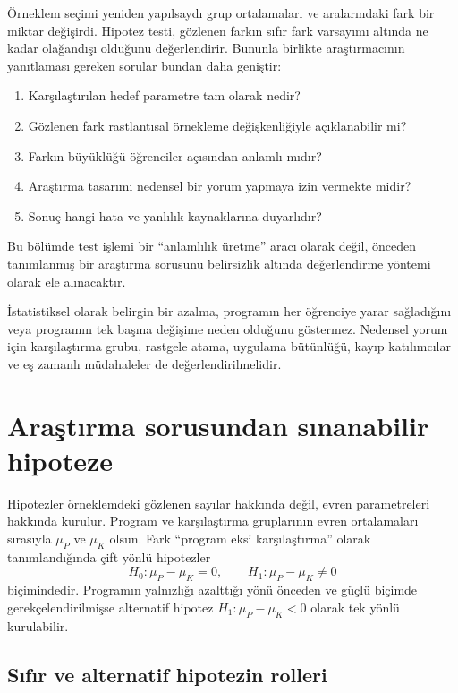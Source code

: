 Örneklem seçimi yeniden yapılsaydı grup ortalamaları ve aralarındaki fark bir
miktar değişirdi. Hipotez testi, gözlenen farkın sıfır fark varsayımı altında
ne kadar olağandışı olduğunu değerlendirir. Bununla birlikte araştırmacının
yanıtlaması gereken sorular bundan daha geniştir:

\begin{enumerate}
  \item Karşılaştırılan hedef parametre tam olarak nedir?
  \item Gözlenen fark rastlantısal örnekleme değişkenliğiyle açıklanabilir mi?
  \item Farkın büyüklüğü öğrenciler açısından anlamlı mıdır?
  \item Araştırma tasarımı nedensel bir yorum yapmaya izin vermekte midir?
  \item Sonuç hangi hata ve yanlılık kaynaklarına duyarlıdır?
\end{enumerate}

Bu bölümde test işlemi bir ``anlamlılık üretme'' aracı olarak değil, önceden
tanımlanmış bir araştırma sorusunu belirsizlik altında değerlendirme yöntemi
olarak ele alınacaktır.

\begin{researchbox}
İstatistiksel olarak belirgin bir azalma, programın her öğrenciye yarar
sağladığını veya programın tek başına değişime neden olduğunu göstermez.
Nedensel yorum için karşılaştırma grubu, rastgele atama, uygulama bütünlüğü,
kayıp katılımcılar ve eş zamanlı müdahaleler de değerlendirilmelidir.
\end{researchbox}

\section{Araştırma sorusundan sınanabilir hipoteze}

Hipotezler örneklemdeki gözlenen sayılar hakkında değil, evren parametreleri
hakkında kurulur. Program ve karşılaştırma gruplarının evren ortalamaları
sırasıyla $\mu_P$ ve $\mu_K$ olsun. Fark ``program eksi karşılaştırma'' olarak
tanımlandığında çift yönlü hipotezler
\[
H_0:\mu_P-\mu_K=0,
\qquad
H_1:\mu_P-\mu_K\neq0
\]
biçimindedir. Programın yalnızlığı azalttığı yönü önceden ve güçlü biçimde
gerekçelendirilmişse alternatif hipotez $H_1:\mu_P-\mu_K<0$ olarak tek yönlü
kurulabilir.

\subsection{Sıfır ve alternatif hipotezin rolleri}

